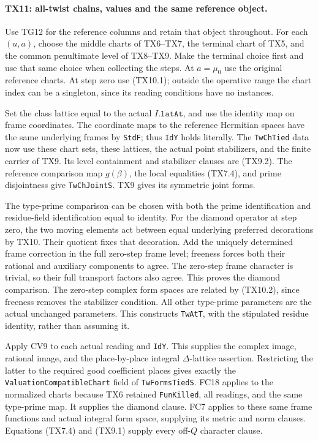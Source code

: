 \paragraph{TX11: all-twist chains, values and the same reference object.}
Use TG12 for the reference columns and retain that object throughout.
For each \((u,a)\), choose the middle charts of TX6--TX7, the
terminal chart of TX5, and the common penultimate level of
TX8--TX9. Make the terminal choice first and use that same choice
when collecting the steps. At \(a=\mu_0\) use the original
reference charts. At step zero use (TX10.1); outside the operative
range the chart index can be a singleton, since its reading
conditions have no instances.

Set the class lattice equal to the actual \(I.\texttt{latAt}\),
and use the identity map on frame coordinates. The coordinate
maps to the reference Hermitian spaces have the same underlying
frames by \texttt{StdF}; thus \texttt{IdY} holds literally.
The \texttt{TwChTied} data now use these chart sets, these
lattices, the actual point stabilizers, and the finite carrier
of TX9. Its level containment and stabilizer clauses are
(TX9.2). The reference comparison map \(g(\beta)\), the local
equalities (TX7.4), and prime disjointness give
\texttt{TwChJointS}. TX9 gives its symmetric joint forms.

The type-prime comparison can be chosen with both the prime
identification and residue-field identification equal to identity.
For the diamond operator at step zero, the two moving elements
act between equal underlying preferred decorations by TX10.
Their quotient fixes that decoration. Add the uniquely determined
frame correction in the full zero-step frame level; freeness
forces both their rational and auxiliary components to agree.
The zero-step frame character is trivial, so their full
transport factors also agree. This proves the diamond comparison.
The zero-step complex form spaces are related by (TX10.2),
since freeness removes the stabilizer condition. All other
type-prime parameters are the actual unchanged parameters.
This constructs \texttt{TwAtT}, with the stipulated residue
identity, rather than assuming it.

Apply CV9 to each actual reading and \texttt{IdY}. This supplies
the complex image, rational image, and the place-by-place
integral \(\Delta\)-lattice assertion. Restricting the latter
to the required good coefficient places gives exactly the
\texttt{ValuationCompatibleChart} field of \texttt{TwFormsTiedS}.
FC18 applies to the normalized charts because TX6 retained
\texttt{FunKilled}, all readings, and the same type-prime map.
It supplies the diamond clause. FC7 applies to these same frame
functions and actual integral form space, supplying its metric
and norm clauses. Equations (TX7.4) and (TX9.1) supply every
off-\(Q\) character clause.

